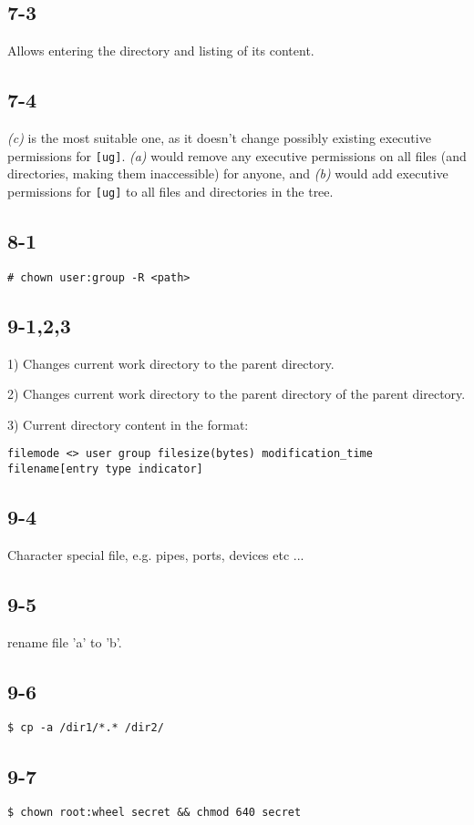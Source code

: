 \subsection{7-3}
Allows entering the directory and listing of its content.

\subsection{7-4}
\emph{(c)} is the most suitable one, as it doesn't change possibly existing executive permissions for \verb=[ug]=. \emph{(a)} would remove any executive permissions on all files (and directories, making them inaccessible) for anyone, and \emph{(b)} would add executive permissions for \verb=[ug]= to all files and directories in the tree.

\subsection{8-1}
\verb=# chown user:group -R <path>=

\subsection{9-1,2,3}
1) Changes current work directory to the parent directory.

2) Changes current work directory to the parent directory of the parent directory.

3) Current directory content in the format:

\verb=filemode <> user group filesize(bytes) modification_time filename[entry type indicator]=

\subsection{9-4}
Character special file, e.g. pipes, ports, devices etc ...

\subsection{9-5}
rename file 'a' to 'b'.

\subsection{9-6}
\verb=$ cp -a /dir1/*.* /dir2/=

\subsection{9-7}
\verb=$ chown root:wheel secret && chmod 640 secret=


